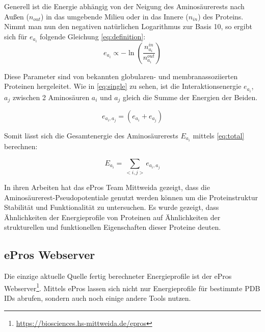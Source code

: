 Generell ist die Energie abhängig von der Neigung des Aminosäurerests nach Außen ($n_{out}$) in das umgebende Milieu oder in das Innere ($n_{in}$) des Proteins. Nimmt man nun den negativen natürlichen Logarithmus zur Basis 10, so ergibt sich für $e_{a_i}$ folgende Gleichung \ref{eq:definition}:
%
\begin{equation}
  	e_{a_i} \propto -\ln{\left(\frac{n_{a_i}^{in}}{n_{a_i}^{out}}\right)}
  	\label{eq:definition}
\end{equation}

Diese Parameter sind von bekannten globularen- und membranassoziierten Proteinen hergeleitet. Wie in \ref{eq:single} zu sehen, ist die Interaktionsenergie $e_{a_{i}}$, $a_{j}$ zwischen 2 Aminosäuren $a_{i}$ und $a_{j}$ gleich die Summe der Energien der Beiden. 

\begin{equation}
  	e_{a_{i},a_{j}} = \left( e_{a_{i}} + e_{a_{j}} \right)
    \label{eq:single}
\end{equation}

Somit lässt sich die Gesamtenergie des Aminosäurerests $E_{a_i}$ mittels \ref{eq:total} berechnen:

\begin{equation}
    E_{a_{i}} = \sum_{< i, j >}{e_{a_{i},a_{j}}}
    \label{eq:total}
\end{equation}

In ihren Arbeiten \cite{Heinke.2011} hat das ePros Team Mittweida gezeigt, dass die Aminosäurerest-Pseudopotentiale genutzt werden können um die Proteinstruktur Stabilität und Funktionalität zu untersuchen. Es wurde gezeigt, dass Ähnlichkeiten der Energieprofile von Proteinen auf Ähnlichkeiten der strukturellen und funktionellen Eigenschaften dieser Proteine deuten.


\subsection{ePros Webserver}
\label{sec:epros}
Die einzige aktuelle Quelle fertig berechneter Energieprofile ist der ePros Webserver\footnote{\url{https://biosciences.hs-mittweida.de/epros}}. Mittels ePros lassen sich nicht nur Energieprofile für bestimmte \ac{PDB} IDs abrufen, sondern auch noch einige andere Tools nutzen.

